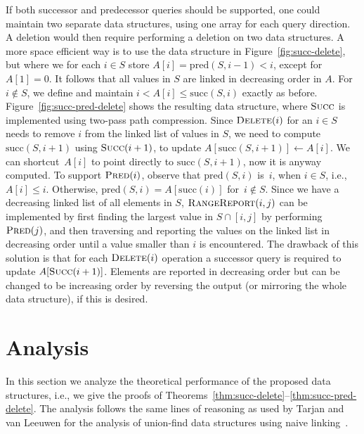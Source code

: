 \documentclass[a4paper]{lipics-v2021}
\newcommand{\successor}{\mathrm{succ}}
\newcommand{\predecessor}{\mathrm{pred}}
\newcommand{\FuncName}[1]{\textup{\textsc{#1}}}
\newcommand{\Delete}{\FuncName{Delete}}
\newcommand{\Succ}{\FuncName{Succ}}
\newcommand{\Pred}{\FuncName{Pred}}
\newcommand{\RangeReport}{\FuncName{RangeReport}}
\begin{document}
If both successor and predecessor queries should be supported, one could maintain two separate data structures, using one array for each query direction. A deletion would then require performing a deletion on two data structures. A more space efficient way is to use the data structure in Figure~\ref{fig:succ-delete}, but where we for each $i \in S$ store $A[i]=\predecessor(S, i-1)<i$, except for $A[1]=0$. It follows that all values in $S$ are linked in decreasing order in $A$. For~$i \notin S$, we define and maintain $i<A[i]\leq\successor(S,i)$ exactly as before. Figure~\ref{fig:succ-pred-delete} shows the resulting data structure, where $\Succ$ is implemented using two-pass path compression. Since $\Delete(i)$ for an $i \in S$ needs to remove $i$ from the linked list of values in $S$, we need to compute $\successor(S, i+1)$ using $\Succ(i+1)$, to update $A[\successor(S, i+1)]\leftarrow A[i]$. We can shortcut~$A[i]$ to point directly to $\successor(S, i+1)$, now it is anyway computed. To support $\Pred(i)$, observe that $\predecessor(S, i)$ is~$i$, when $i\in S$, i.e., $A[i] \leq i$. Otherwise, $\predecessor(S, i)=A[\successor(i)]$ for~$i \notin S$. Since we have a decreasing linked list of all elements in $S$, $\RangeReport(i,j)$ can be implemented by first finding the largest value in $S \cap [i,j]$ by performing $\Pred(j)$, and then traversing and reporting the values on the linked list in decreasing order until a value smaller than $i$ is encountered. The drawback of this solution is that for each $\Delete(i)$ operation a successor query is required to update $A[\Succ(i+1)]$. Elements are reported in decreasing order but can be changed to be increasing order by reversing the output (or mirroring the whole data structure), if this is desired.

\section{Analysis}
\label{sec:analysis}

In this section we analyze the theoretical performance of the proposed data structures, i.e., we give the proofs of Theorems~\ref{thm:succ-delete}--\ref{thm:succ-pred-delete}. The analysis follows the same lines of reasoning as used by Tarjan and van Leeuwen for the analysis of union-find data structures using naive linking~\cite{TarjanLeeuwen84}.

\end{document}
